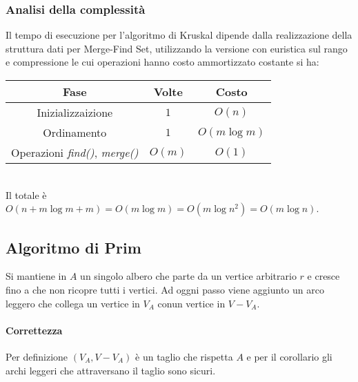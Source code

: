 \subsubsection{Analisi della complessit\`a}
Il tempo di esecuzione per l'algoritmo di Kruskal dipende dalla realizzazione della struttura dati per Merge-Find Set, utilizzando la versione con euristica sul rango e compressione le
cui operazioni hanno costo ammortizzato costante si ha:\\
\begin{tabular}{|c|c|c|}
	\hline
	\textbf{Fase} & \textbf{Volte} & \textbf{Costo} \\
	\hline
	Inizializzaizione & $1$ & $O(n)$ \\
	\hline
	Ordinamento & $1$ & $O(m\log m)$ \\
	\hline
	Operazioni \emph{find()}, \emph{merge()} & $O(m)$ & $O(1)$\\
	\hline
\end{tabular}\\
Il totale \`e $O(n+m\log m + m) = O(m\log m) = O(m\log n^2) = O(m\log n)$.
\subsection{Algoritmo di Prim}
Si mantiene in $A$ un singolo albero che parte da un vertice arbitrario $r$ e cresce fino a che non ricopre tutti i vertici. Ad oggni passo viene aggiunto un arco leggero che collega
un vertice in $V_A$ conun vertice in $V-V_A$.
\paragraph{Correttezza} Per definizione $(V_A, V - V_A)$ \`e un taglio che rispetta $A$ e per il corollario gli archi leggeri che attraversano il taglio sono sicuri. 
